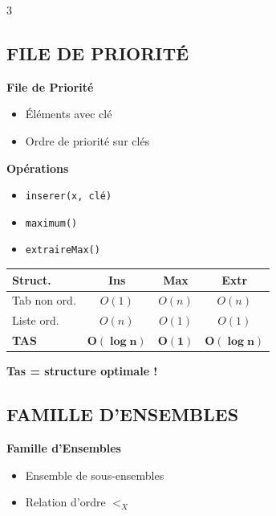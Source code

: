 \documentclass[10pt,a4paper,landscape]{article}
\begin{document}
\begin{multicols}{3}
\subsection*{FILE DE PRIORITÉ}

\begin{defbox}
\textbf{File de Priorité}
\begin{itemize}
\item Éléments avec clé
\item Ordre de priorité sur clés
\end{itemize}
\end{defbox}

\begin{algobox}
\textbf{Opérations}
\begin{itemize}
\item \texttt{inserer(x, clé)}
\item \texttt{maximum()}
\item \texttt{extraireMax()}
\end{itemize}
\end{algobox}

\begin{complexbox}
\small
\begin{tabular}{lccc}
\textbf{Struct.} & \textbf{Ins} & \textbf{Max} & \textbf{Extr} \\
\hline
Tab non ord. & $O(1)$ & $O(n)$ & $O(n)$ \\
Liste ord. & $O(n)$ & $O(1)$ & $O(1)$ \\
\textbf{TAS} & $\mathbf{O(\log n)}$ & $\mathbf{O(1)}$ & $\mathbf{O(\log n)}$ \\
\end{tabular}
\end{complexbox}

\begin{importbox}
\textbf{Tas = structure optimale !}
\end{importbox}

\subsection*{FAMILLE D'ENSEMBLES}

\begin{defbox}
\textbf{Famille d'Ensembles}
\begin{itemize}
\item Ensemble de sous-ensembles
\item Relation d'ordre $<_X$
\end{itemize}
\end{defbox}


\end{multicols}
\end{document}
